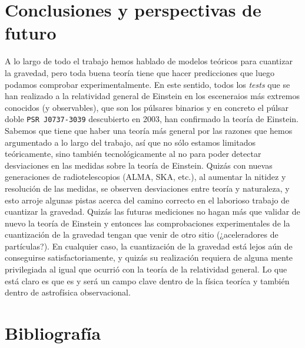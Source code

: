 \documentclass[11pt,a4paper,titlepage]{article}
\begin{document}
%
%
%
%
\newpage
\section{Conclusiones y perspectivas de futuro} %

A lo largo de todo el trabajo hemos hablado de modelos teóricos para cuantizar la gravedad, pero toda buena teoría tiene que hacer predicciones que luego podamos comprobar experimentalmente. En este sentido, todos los \emph{tests} que se han realizado a la relatividad general de Einstein en los esceneraios más extremos conocidos (y observables), que son los púlsares binarios y en concreto el púlsar doble \texttt{PSR J0737-3039} descubierto en 2003, han confirmado la teoría de Einstein. Sabemos que tiene que haber una teoría más general por las razones que hemos argumentado a lo largo del trabajo, así que no sólo estamos limitados teóricamente, sino también tecnológicamente al no para poder detectar desviaciones en las medidas sobre la teoría de Einstein. Quizás con nuevas generaciones de radiotelescopios (ALMA, SKA, etc.), al aumentar la nitidez y resolución de las medidas, se observen desviaciones entre teoría y naturaleza, y esto arroje algunas pistas acerca del camino correcto en el laborioso trabajo de cuantizar la gravedad. Quizás las futuras mediciones no hagan más que validar de nuevo la teoría de Einstein y entonces las comprobaciones experimentales de la cuantización de la gravedad tengan que venir de otro sitio (¿aceleradores de partículas?). En cualquier caso, la cuantización de la gravedad está lejos aún de conseguirse satisfactoriamente, y quizás su realización requiera de alguna mente privilegiada al igual que ocurrió con la teoría de la relatividad general. Lo que está claro es que es y será un campo clave dentro de la física teoríca y también dentro de astrofísica observacional.


%
%
%
%
\newpage
\section{Bibliografía}


\nocite{*}
\end{document}
